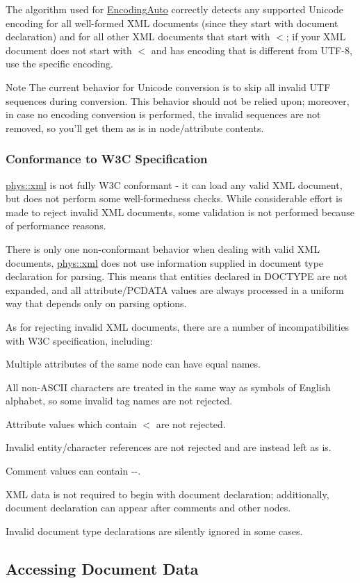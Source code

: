 The algorithm used for \hyperlink{namespacephys_1_1xml_a420f5de782438f88160321385bea2015}{EncodingAuto} correctly detects any supported Unicode encoding for all well-\/formed XML documents (since they start with document declaration) and for all other XML documents that start with $<$; if your XML document does not start with $<$ and has encoding that is different from UTF-\/8, use the specific encoding. \begin{DoxyNote}{Note}
The current behavior for Unicode conversion is to skip all invalid UTF sequences during conversion. This behavior should not be relied upon; moreover, in case no encoding conversion is performed, the invalid sequences are not removed, so you'll get them as is in node/attribute contents.
\end{DoxyNote}
\hypertarget{XMLManual_XMLLoadingStandards}{}\subsubsection{Conformance to W3C Specification}\label{XMLManual_XMLLoadingStandards}
\hyperlink{namespacephys_1_1xml}{phys::xml} is not fully W3C conformant -\/ it can load any valid XML document, but does not perform some well-\/formedness checks. While considerable effort is made to reject invalid XML documents, some validation is not performed because of performance reasons. \par
 \par
 There is only one non-\/conformant behavior when dealing with valid XML documents, \hyperlink{namespacephys_1_1xml}{phys::xml} does not use information supplied in document type declaration for parsing. This means that entities declared in DOCTYPE are not expanded, and all attribute/PCDATA values are always processed in a uniform way that depends only on parsing options. \par
 \par
 As for rejecting invalid XML documents, there are a number of incompatibilities with W3C specification, including:
\begin{DoxyItemize}
\item Multiple attributes of the same node can have equal names.
\item All non-\/ASCII characters are treated in the same way as symbols of English alphabet, so some invalid tag names are not rejected.
\item Attribute values which contain $<$ are not rejected.
\item Invalid entity/character references are not rejected and are instead left as is.
\item Comment values can contain -\/-\/.
\item XML data is not required to begin with document declaration; additionally, document declaration can appear after comments and other nodes.
\item Invalid document type declarations are silently ignored in some cases.
\end{DoxyItemize}\hypertarget{XMLManual_XMLAccessing}{}\subsection{Accessing Document Data}\label{XMLManual_XMLAccessing}

